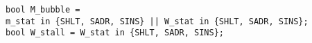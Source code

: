 \documentclass{article}
\begin{document}
\texttt{bool M\_bubble = \\
\hspace*{17mm} m\_stat in \{SHLT, SADR, SINS\} || W\_stat in \{SHLT, SADR, SINS\}; \\
}
\texttt{bool W\_stall =
	W\_stat in \{SHLT, SADR, SINS\};
}
\end{document}
